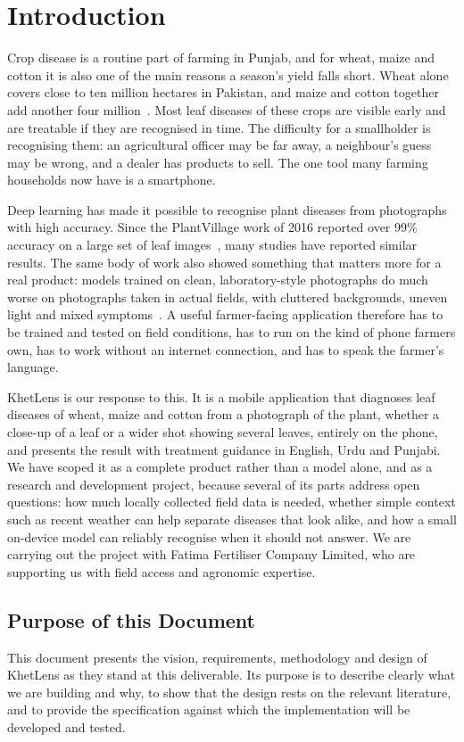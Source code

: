 \chapter{Introduction}
\label{ch:intro}

Crop disease is a routine part of farming in Punjab, and for wheat, maize and cotton it is also one of the main reasons a season's yield falls short. Wheat alone covers close to ten million hectares in Pakistan, and maize and cotton together add another four million~\cite{fao_pakistan}. Most leaf diseases of these crops are visible early and are treatable if they are recognised in time. The difficulty for a smallholder is recognising them: an agricultural officer may be far away, a neighbour's guess may be wrong, and a dealer has products to sell. The one tool many farming households now have is a smartphone.

Deep learning has made it possible to recognise plant diseases from photographs with high accuracy. Since the PlantVillage work of 2016 reported over 99\% accuracy on a large set of leaf images~\cite{mohanty2016}, many studies have reported similar results. The same body of work also showed something that matters more for a real product: models trained on clean, laboratory-style photographs do much worse on photographs taken in actual fields, with cluttered backgrounds, uneven light and mixed symptoms~\cite{xu2024datasets,singh2020plantdoc}. A useful farmer-facing application therefore has to be trained and tested on field conditions, has to run on the kind of phone farmers own, has to work without an internet connection, and has to speak the farmer's language.

KhetLens is our response to this. It is a mobile application that diagnoses leaf diseases of wheat, maize and cotton from a photograph of the plant, whether a close-up of a leaf or a wider shot showing several leaves, entirely on the phone, and presents the result with treatment guidance in English, Urdu and Punjabi. We have scoped it as a complete product rather than a model alone, and as a research and development project, because several of its parts address open questions: how much locally collected field data is needed, whether simple context such as recent weather can help separate diseases that look alike, and how a small on-device model can reliably recognise when it should not answer. We are carrying out the project with Fatima Fertiliser Company Limited, who are supporting us with field access and agronomic expertise.

\section{Purpose of this Document}
This document presents the vision, requirements, methodology and design of KhetLens as they stand at this deliverable. Its purpose is to describe clearly what we are building and why, to show that the design rests on the relevant literature, and to provide the specification against which the implementation will be developed and tested.


